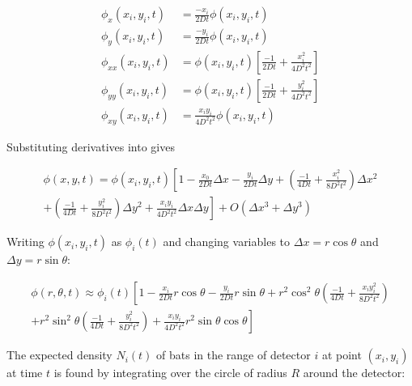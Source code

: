 \begin{equation}
\begin{split}
\phi_x(x_i,y_i,t) &= \frac{-x_i}{2Dt} \phi(x_i,y_i,t) \\
\phi_y(x_i,y_i,t) &= \frac{-y_i}{2Dt} \phi(x_i,y_i,t) \\
\phi_{xx}(x_i,y_i,t) &= \phi(x_i,y_i,t) \left[ \frac{-1}{2Dt} + \frac{x_i^2}{4D^2t^2}\right] \\
\phi_{yy}(x_i,y_i,t) &= \phi(x_i,y_i,t) \left[ \frac{-1}{2Dt} + \frac{y_i^2}{4D^2t^2}\right] \\
\phi_{xy}(x_i,y_i,t) &= \frac{x_iy_i}{4D^2t^2}\phi(x_i,y_i,t)
\end{split}
\nonumber
\end{equation}

Substituting derivatives into  gives

\begin{multline}
\phi(x,y,t) = \phi(x_i,y_i,t) \left[1 - \frac{x_0}{2Dt}\Delta x - \frac{y_i}{2Dt} \Delta y + \left( \frac{-1}{4Dt} + \frac{x_i^2}{8D^2t^2} \right)\Delta x^2  \right. \\
\left. + \left( \frac{-1}{4Dt} + \frac{y_i^2}{8D^2t^2} \right) \Delta y^2 + \frac{x_iy_i}{4D^2t^2}\Delta x \Delta y \right] + O(\Delta x^3 + \Delta y ^3)
\end{multline}

Writing $\phi(x_i,y_i,t)$ as $\phi_i(t)$ and changing variables to $\Delta x = r\cos{\theta}$ and $\Delta y = r\sin{\theta}$:

\begin{multline}
\phi(r,\theta,t) \approx \phi_i(t) \left[ 1 - \frac{x_i}{2Dt} r\cos{\theta} - \frac{y_i}{2Dt} r\sin{\theta} +  r^2 \cos^2{\theta} \left(\frac{-1}{4Dt} + \frac{x_iy_i^2}{8D^2t^2} \right) \right. \\
\left. + r^2\sin^2{\theta}\left(\frac{-1}{4Dt} + \frac{y_i^2}{8D^2t^2} \right) + \frac{x_i y_i}{4D^2t^2} r^2\sin{\theta}\cos{\theta} \right]
\label{eqn:phi_polar}
\end{multline}

The expected density $N_i(t)$ of bats in the range of detector $i$ at point $(x_i,y_i)$ at time $t$ is found by integrating over the circle of radius $R$ around the detector:

